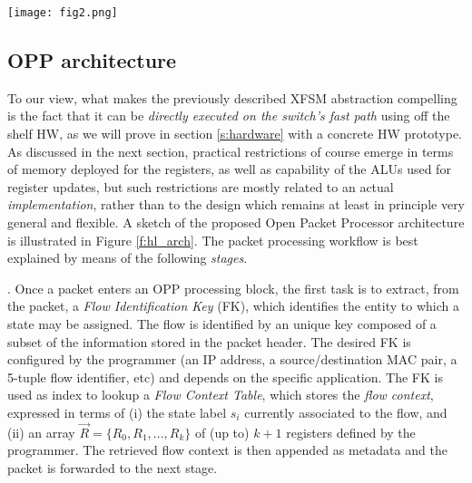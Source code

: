 \documentclass{sig-alternate}
\begin{document}
\begin{figure*}[t]
	\centering
	\texttt{[image: fig2.png]} 
		  \vspace{-2em}
	\caption{OPP architecture}
		  \vspace{-1em}
	\label{f:hl_arch}
\end{figure*}

\subsection{OPP architecture}
\label{ss:arch}

To our view, what makes the previously described XFSM abstraction compelling is the fact that it can be {\em directly executed on the switch's fast path} using off the shelf HW, as we will prove in section \ref{s:hardware} with a concrete HW prototype. As discussed in the next section, practical restrictions of course emerge in terms of memory deployed for the registers, as well as capability of the ALUs used for register updates, but such restrictions are mostly related to an actual {\em  implementation}, rather than to the design which remains at least in principle very general and flexible. A sketch of the proposed Open Packet Processor architecture is illustrated in Figure \ref{f:hl_arch}. The packet processing workflow is best explained by means of the following {\em stages}.

\vspace{3pt} . Once a packet enters an OPP processing block, the first task is to extract, from the packet, a {\em Flow Identification Key} (FK), which identifies the entity to which a state may be assigned. The flow is identified by an unique key composed of a subset of the information stored in the packet header. The desired FK is configured by the programmer  (an IP address, a source/destination MAC pair, a 5-tuple flow identifier, etc) and depends on the specific application. The FK is used as index to lookup a {\em Flow Context Table}, which stores the {\em flow context}, expressed in terms of (i) the state label $s_i$ currently associated to the flow, and (ii) an array $\vec{R} = \{R_0, R_1, ..., R_k\}$ of (up to) $k+1$ registers defined by the programmer. The retrieved flow context is then appended as metadata and the packet is forwarded to the next stage.
\end{document}
